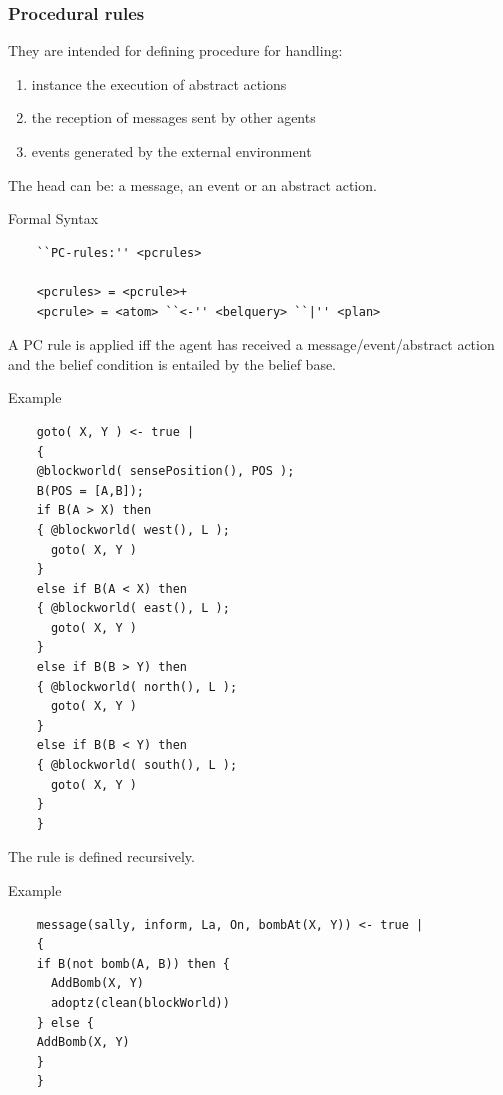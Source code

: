 \documentclass[dvipsnames,usenames,10pt]{beamer}
\newcommand{\bsyntax}{\begin{beamerboxesrounded}[upper=synupcol,lower=synlowcol,shadow=true]{Formal Syntax}}
\newcommand{\esyntax}{\end{beamerboxesrounded}}
\newcommand{\bexample}{\begin{beamerboxesrounded}[upper=exupcol,lower=exlowcol,shadow=true]{Example}}
\newcommand{\eexample}{\end{beamerboxesrounded}}
\begin{document}
\begin{frame}
	\frametitle{Procedural rules}

	They are intended for defining procedure for handling:

	\begin{enumerate}
		\item instance the execution of abstract actions
		\item the reception of messages sent by other agents
		\item events generated by the external environment
	\end{enumerate}

	\break
	
	The head can be: a message, an event or an abstract action.

	\bsyntax
	\begin{verbatim}
	``PC-rules:'' <pcrules>
	
	<pcrules> = <pcrule>+
	<pcrule> = <atom> ``<-'' <belquery> ``|'' <plan>
	\end{verbatim}
	\esyntax

	A PC rule is applied iff the agent has received a message/event/abstract action and the belief condition is entailed by the belief base.

	\break

	\bexample
	\begin{verbatim}
	goto( X, Y ) <- true |
	{
	@blockworld( sensePosition(), POS );
    B(POS = [A,B]);
    if B(A > X) then
    { @blockworld( west(), L );
      goto( X, Y )
    }
    else if B(A < X) then
    { @blockworld( east(), L );
      goto( X, Y )
    }
    else if B(B > Y) then
    { @blockworld( north(), L );
      goto( X, Y )
    }
    else if B(B < Y) then
    { @blockworld( south(), L );
      goto( X, Y )
    }
	}
	\end{verbatim}
	\eexample

	The rule is defined recursively.

	\break

	\bexample
	\begin{verbatim}
	message(sally, inform, La, On, bombAt(X, Y)) <- true |
	{
	if B(not bomb(A, B)) then { 
	  AddBomb(X, Y)
	  adoptz(clean(blockWorld))
	} else { 
	AddBomb(X, Y)
	}
	}
	\end{verbatim}
	\eexample
\end{frame}
\end{document}
